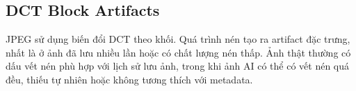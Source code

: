 \subsection{DCT Block Artifacts}
JPEG sử dụng biến đổi DCT theo khối. Quá trình nén tạo ra artifact đặc trưng, nhất là ở ảnh đã lưu nhiều lần hoặc có chất lượng nén thấp. Ảnh thật thường có dấu vết nén phù hợp với lịch sử lưu ảnh, trong khi ảnh AI có thể có vết nén quá đều, thiếu tự nhiên hoặc không tương thích với metadata.
